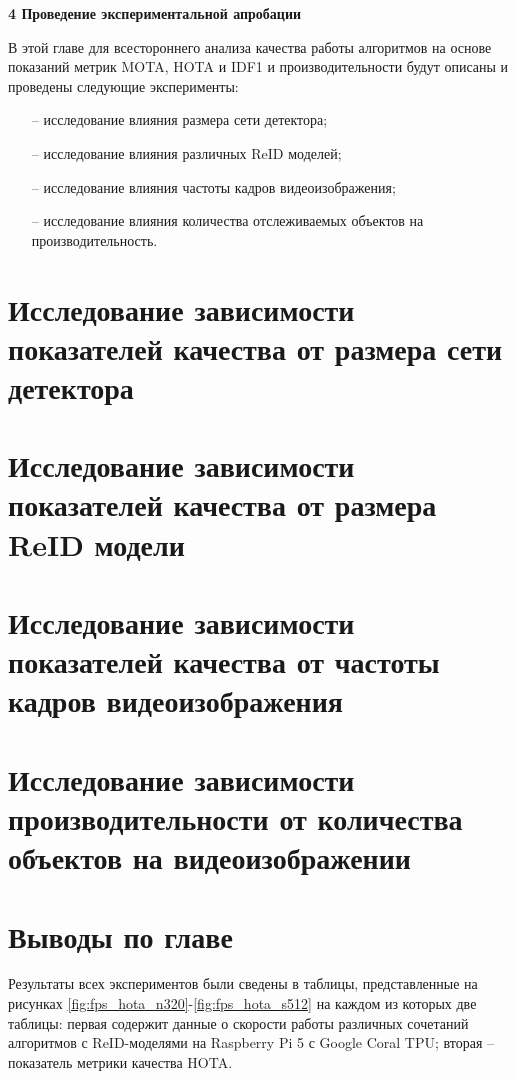 \newpage
\begin{flushleft}
  \textbf{\large 4 Проведение экспериментальной апробации}
\end{flushleft}
В этой главе для всестороннего анализа качества работы алгоритмов на основе показаний метрик MOTA, HOTA и IDF1 и производительности будут описаны и проведены следующие эксперименты:
\begin{itemize}
  \item[--] исследование влияния размера сети детектора;
  \item[--] исследование влияния различных ReID моделей;
  \item[--] исследование влияния частоты кадров видеоизображения;
  \item[--] исследование влияния количества отслеживаемых объектов на производительность.
\end{itemize}


\section{Исследование зависимости показателей качества от размера сети детектора}



\section{Исследование зависимости показателей качества от размера ReID модели}


\section{Исследование зависимости показателей качества от частоты кадров видеоизображения}


\section{Исследование зависимости производительности от количества объектов на видеоизображении}


\section{Выводы по главе}
Результаты всех экспериментов были сведены в таблицы, представленные на рисунках \ref{fig:fps_hota_n320}-\ref{fig:fps_hota_s512} на каждом из которых две таблицы: первая содержит данные о скорости работы различных сочетаний алгоритмов с ReID-моделями на Raspberry Pi 5 с Google Coral TPU; вторая -- показатель метрики качества HOTA. 

